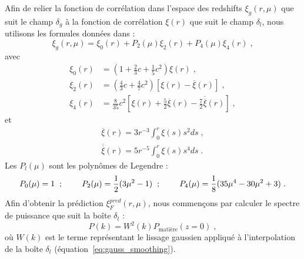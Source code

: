   Afin de relier la fonction de corrélation dans l'espace des redshifts $\xi_g(r, \mu)$ que suit le champ $\delta_g$ à la fonction de corrélation $\xi(r)$ que suit le champ $\delta_l$, nous utilisons les formules données dans \textcite{Hamilton1992} :
\begin{equation}
  \label{eq:hamilton1}
  \xi_g(r, \mu) = \xi_0(r) +  P_2(\mu) \xi_2(r) +  P_4(\mu) \xi_4(r) \; ,
\end{equation}
avec
\begin{align}
  \label{eq:hamilton2}
  \xi_0(r) &= \left(1 + \frac{2}{3} c + \frac{1}{5} c^2\right) \xi(r) \; , \\
  \xi_2(r) &= \left(\frac{4}{3} c + \frac{4}{7} c^2\right) \left[\xi(r) - \overline \xi(r)\right] \; , \\
  \xi_4(r) &= \frac{8}{35} c^2\left[\xi(r) + \frac{5}{2} \overline \xi(r) - \frac{7}{2} \overline{\overline \xi}(r)\right] \; ,
\end{align}
et
\begin{align}
  \label{eq:hamilton3}
  \overline \xi(r) = 3 r^{-3} \int_0^r \xi(s) s^2 ds \; , \\
  \overline{\overline \xi}(r) = 5 r^{-5} \int_0^r \xi(s) s^4 ds \; .
\end{align}
Les $P_l(\mu)$ sont les polynômes de Legendre :
\begin{equation}
  P_0(\mu) = 1 \hspace{0.2cm} ; \hspace{0.8cm} P_2(\mu) = \frac{1}{2} (3 \mu^2 - 1) \hspace{0.2cm} ; \hspace{0.8cm}   P_4(\mu) = \frac{1}{8} (35 \mu^4 - 30 \mu^2 + 3) \; .
\end{equation}
Afin d'obtenir la prédiction $\xi_F^{pred}(r, \mu)$, nous commençons par calculer  le spectre de puissance que suit la boîte $\delta_l$ :
\begin{equation}
  P(k) = W^2(k)P_{\mathrm{matière}}(z=0) \; ,
\end{equation}
où $W(k)$ est le terme représentant le lissage gaussien appliqué à l'interpolation de la boîte $\delta_l$ (équation~\ref{eq:gauss_smoothing}).
